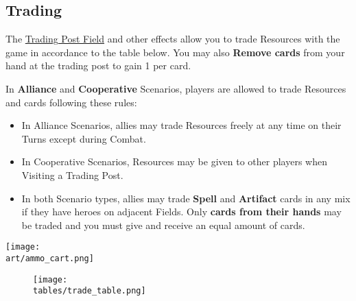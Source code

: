 \begin{multicols}{2}

\subsection*{\hypertarget{Trading}{Trading}}

The \hyperlink{Trading Post}{Trading Post Field} and other effects allow you to trade Resources with the game in accordance to the table below.
You may also \textbf{Remove cards} from your hand at the trading post to gain 1  per card.\par
{}\par
In \textbf{Alliance} and \textbf{Cooperative} Scenarios, players are allowed to trade Resources and cards following these rules:
\begin{itemize}
  \item In Alliance Scenarios, allies may trade Resources freely at any time on their Turns except during Combat.
  \item In Cooperative Scenarios, Resources may be given to other players when Visiting a Trading Post.
  \item In both Scenario types, allies may trade \textbf{Spell} and \textbf{Artifact} cards in any mix if they have heroes on adjacent Fields.
    Only \textbf{cards from their hands} may be traded and you must give and receive an equal amount of cards.
\end{itemize}

\vspace*{\fill}
\texttt{[image: \\art/ammo\_cart.png]}

\end{multicols}

\vfill
\begin{figure*}[!hb]
  \centering
  \texttt{[image: \\tables/trade\_table.png]}
\end{figure*}
\vfill
